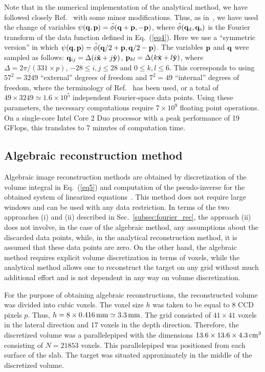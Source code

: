 Note that in the numerical implementation of the analytical method, we have followed closely Ref.~\cite{konecky_08_1} with some minor modifications. Thus, as in~\cite{konecky_08_1}, we have used the change of variables $\psi({\bf q}, {\bf p}) = \tilde{\phi}({\bf q} + {\bf p}, -{\bf p})$, where $\tilde{\phi}({\bf q}_{\rm d}, {\bf q}_{\rm s})$ is the Fourier transform of the data function defined in Eq.~(\ref{eq4}).  Here we use a ``symmetric version'' in which $\psi({\bf q}, {\bf p}) = \tilde{\phi}({\bf q}/2 + {\bf p}, {\bf q}/2 - {\bf p})$. The variables ${\bf p}$ and ${\bf q}$ were sampled as
follows: ${\bf q}_{ij} = \Delta (i\hat{\bf x} + j\hat{\bf y})$, ${\bf p}_{kl} = \Delta (k\hat{\bf x} + l\hat{\bf y})$, where $\Delta = 2\pi/(331\times p)$, $-28\le i,j\le 28$ and $0\le k,l\le 6$. This corresponds to using $57^2=3249$ ``external'' degrees of freedom and $7^2=49$ ``internal'' degrees of freedom, where the terminology of Ref.~\cite{markel_04_4} has been used, or a total of $49\times3249\simeq1.6\times10^5$ independent Fourier-space data points. Using these parameters, the necessary computations require $7\times 10^{9}$ floating point operations. On a single-core Intel Core 2 Duo processor with a peak performance of 19 GFlops, this translates to 7 minutes of computation time.

\subsection{Algebraic reconstruction method}
\label{subsec:alg_rec}

Algebraic image reconstruction methods are obtained by discretization of the volume integral in Eq.~(\ref{eq5}) and computation of the pseudo-inverse for the obtained system of linearized equations~\cite{gonatas_95_1}.  This method does not require large windows and can be used with any data restriction. In terms of the two approaches (i) and (ii) described in Sec.~\ref{subsec:fourier_rec}, the approach (ii) does not involve, in the case of the algebraic
method, any assumptions about the discarded data points, while, in the analytical reconstruction method, it is assumed that these data points are zero.  On the other hand, the algebraic method requires explicit volume discretization in terms of voxels, while the analytical method allows one to reconstruct the target on any grid without much additional effort and is not dependent in any way on volume discretization.

For the purpose of obtaining algebraic reconstructions, the reconstructed volume was divided into cubic voxels. The voxel size $h$ was taken to be equal to 8 CCD pixels $p$. Thus, $h=8\times 0.416\,{\rm mm}\simeq 3.3\,{\rm mm}$. The grid consisted of $41\times 41$ voxels in the lateral direction and 17 voxels in the depth direction. Therefore, the discretized volume was a parallelepiped with the dimensions $13.6\times 13.6\times 4.3\,{\rm cm}^3$ consisting of $N=21853$ voxels. This parallelepiped was positioned from each surface of the slab. The target was situated approximately in the middle of
the discretized volume.

